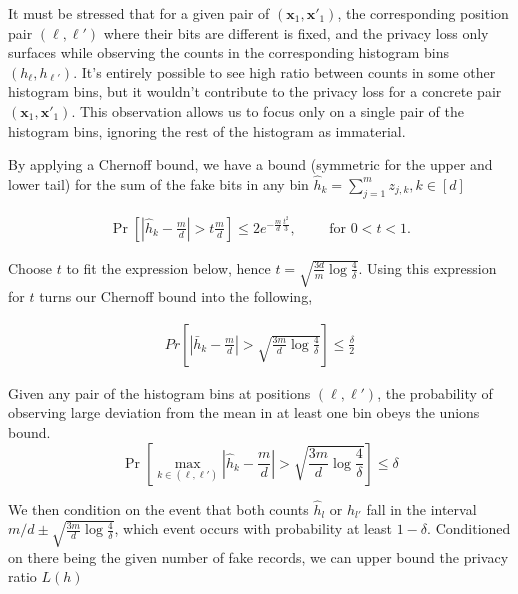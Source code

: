 \documentclass[11pt]{article}
\newcommand{\bbx}{\pmb{x}}
\begin{document}
It must be stressed that for a given pair of $(\bbx_1, \bbx'_1)$, the corresponding position pair $(\ell,\ell')$ where their bits are different is fixed, and the privacy loss only surfaces while observing the counts in the corresponding histogram bins $(h_\ell, h_{\ell'})$.  It's entirely possible to see high ratio between counts in some other histogram bins, but it wouldn't contribute to the privacy loss for a concrete pair $(\bbx_1, \bbx'_1)$.  This observation allows us to focus only on a single pair of the histogram bins, ignoring the rest of the histogram as immaterial.  

By applying a Chernoff bound, we have a bound (symmetric for the upper and lower tail) for the sum of the fake bits in any bin $\hat{h}_k = \sum^m_{j=1} z_{j,k},  k \in [d]$

\begin{align*}
 \Pr \left [ \left | \hat{h}_k - \frac{m}{d} \right | > t \frac{m}{d} \right ]  \le 2 e^{- \frac{m}{d} \frac{t^2}{3}}, \qquad \text{ for  } 0 < t < 1.
\end{align*}

Choose $t$ to fit the expression below, hence $t = \sqrt{  \frac{3d}{m} \log{\frac{4}{\delta}} }$.
Using this expression for $t$ turns our Chernoff bound into the following,
 
 \begin{align}
 Pr \left [ \left | \bar{h}_k - \frac{m}{d} \right | >  \sqrt{  \frac{3m}{d} \log{\frac{4}{\delta}} } \right ]  \le \frac{\delta}{2}
\end{align}

Given any pair of the histogram bins at positions $(\ell,\ell')$, the probability of observing large deviation from the mean in at least one bin obeys the unions bound.
\[
\Pr \left [ \max_{k \in (\ell,\ell')} \left | \hat{h}_k - \frac{m}{d} \right | >  \sqrt{  \frac{3m}{d} \log{\frac{4}{\delta}} } \right ]  \le \delta
\]

We then condition on the event that both counts $\hat{h}_l$ or $\hat{h}_{l'}$ fall in the interval $m/d \pm \sqrt{  \frac{3m}{d} \log{\frac{4}{\delta}}}$, which event occurs with probability at least $1 - \delta$.  
Conditioned on there being the given number of fake records, we can upper bound the privacy ratio $L(h)$
\end{document}
